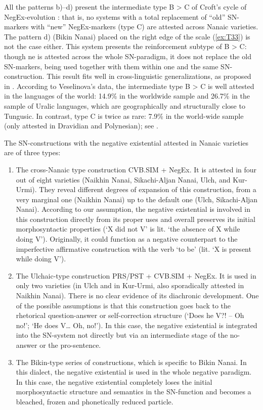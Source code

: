 \documentclass[output=paper]{langscibook}
\begin{document}
All the patterns b)–d) present the intermediate type B > C of Croft’s cycle of NegEx-evolution \citeyearpar{Croft1991}: that is, no systems with a total replacement of “old” SN-markers with “new” NegEx-markers (type C) are attested across Nanaic varieties. The pattern d) (Bikin Nanai) placed on the right edge of the scale (\ref{ex:T33}) is not the case either. This system presents the reinforcement subtype of B > C: though ne is attested across the whole SN-paradigm, it does not replace the old SN-markers, being used together with them within one and the same SN-construction. This result fits well in cross-linguistic generalizations, as proposed in \citet{Veselinova2016}. According to Veselinova’s data, the intermediate type B > C is well attested in the languages of the world: 14.9\% in the worldwide sample and 26.7\% in the sample of Uralic languages, which are geographically and structurally close to Tungusic. In contrast, type C is twice as rare: 7.9\% in the world-wide sample (only attested in Dravidian and Polynesian); see \citet[150]{Veselinova2016}.

The SN-constructions with the negative existential attested in Nanaic varieties are of three types:

\begin{enumerate}[label=(\alph*)]
    \item The cross-Nanaic type construction CVB.SIM + NegEx. It is attested in four out of eight varieties (Naikhin Nanai, Sikachi-Aljan Nanai, Ulch, and Kur-Urmi). They reveal different degrees of expansion of this construction, from a very marginal one (Naikhin Nanai) up to the default one (Ulch, Sikachi-Aljan Nanai). According to our assumption, the negative existential is involved in this construction directly from its proper uses and overall preserves its initial morphosyntactic properties (‘X did not V’ is lit. ‘the absence of X while doing V’). Originally, it could function as a negative counterpart to the imperfective affirmative construction with the verb ‘to be’ (lit. ‘X is present while doing V’).
    \item The Ulchaic-type construction PRS/PST + CVB.SIM + NegEx. It is used in only two varieties (in Ulch and in Kur-Urmi, also sporadically attested in Naikhin Nanai). There is no clear evidence of its diachronic development. One of the possible assumptions is that this construction goes back to the rhetorical question-answer or self-correction structure (‘Does he V?! – Oh no!’; ‘He does V… Oh, no!’). In this case, the negative existential is integrated into the SN-system not directly but via an intermediate stage of the no-answer or the pro-sentence.
    \item The Bikin-type series of constructions, which is specific to Bikin Nanai. In this dialect, the negative existential is used in the whole negative paradigm. In this case, the negative existential completely loses the initial morphosyntactic structure and semantics in the SN-function and becomes a bleached, frozen and phonetically reduced particle.
\end{enumerate}
\end{document}

